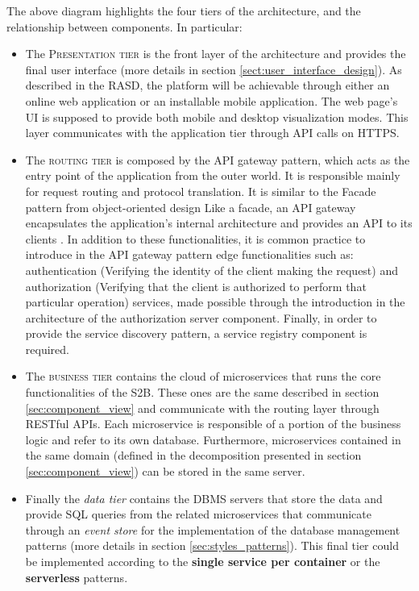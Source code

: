 The above diagram highlights the four tiers of the architecture, and the relationship between components. In particular:
\begin{itemize}
    \item The \textsc{Presentation tier} is the front layer of the architecture and provides the final user interface (more details in section \ref{sect:user_interface_design}). As described in the RASD, the platform will be achievable through either an online web application or an installable mobile application. The web page's UI is supposed to provide both mobile and desktop visualization modes. This layer communicates with the application tier through API calls on HTTPS.
    \item The \textsc{routing tier} is composed by the API gateway pattern, which acts as the entry point of the application from the outer world. It is responsible mainly for request routing and protocol translation. It is similar to the Facade pattern from object-oriented design Like a facade, an API gateway encapsulates the application’s internal architecture and provides an API to its clients \cite{richardson2018microservices}. In addition to these functionalities, it is common practice to introduce in the API gateway pattern edge functionalities such as: authentication (Verifying the identity of the client making the request) and authorization (Verifying that the client is authorized to perform that particular operation) services, made possible through the introduction in the architecture of the authorization server component. Finally, in order to provide the service discovery pattern, a service registry component is required.
    \item The \textsc{business tier} contains the cloud of microservices that runs the core functionalities of the S2B. These ones are the same described in section \ref{sec:component_view} and communicate with the routing layer through RESTful APIs. Each microservice is responsible of a portion of the business logic and refer to its own database. Furthermore, microservices contained in the same domain (defined in the decomposition presented in section \ref{sec:component_view}) can be stored in the same server.
    \item Finally the \textit{data tier} contains the DBMS servers that store the data and provide SQL queries from the related microservices that communicate through an \textit{event store} for the implementation of the database management patterns (more details in section \ref{sec:styles_patterns}). This final tier could be implemented according to the \textbf{single service per container} or the \textbf{serverless} patterns.
\end{itemize}
